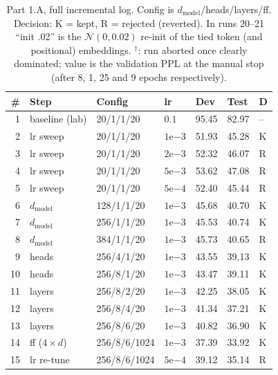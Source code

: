 \documentclass[a4paper]{article}
\begin{document}
\clearpage

\begin{table}[t]
  \centering
  \caption{Part 1.A, full incremental log. Config is $d_{\mathrm{model}}$/heads/layers/ff. Decision: K = kept, R = rejected (reverted). In runs 20--21 ``init .02'' is the $\mathcal{N}(0, 0.02)$ re-init of the tied token (and positional) embeddings. $^\dagger$: run aborted once clearly dominated; value is the validation PPL at the manual stop (after 8, 1, 25 and 9 epochs respectively).}
  \label{tab:parta}
  \scriptsize
  \begin{tabular}{@{}rllllll@{}}
    \toprule
    \# & Step & Config & lr & Dev & Test & D \\
    \midrule
    1  & baseline (lab)   & 20/1/1/20      & $0.1$              & 95.45 & 82.97 & -- \\
    2  & lr sweep         & 20/1/1/20      & $1\mathrm{e}{-3}$  & 51.93 & 45.28 & K \\
    3  & lr sweep         & 20/1/1/20      & $2\mathrm{e}{-3}$  & 52.32 & 46.07 & R \\
    4  & lr sweep         & 20/1/1/20      & $5\mathrm{e}{-3}$  & 53.62 & 47.08 & R \\
    5  & lr sweep         & 20/1/1/20      & $5\mathrm{e}{-4}$  & 52.40 & 45.44 & R \\
    6  & $d_{\mathrm{model}}$ & 128/1/1/20 & $1\mathrm{e}{-3}$  & 45.68 & 40.70 & K \\
    7  & $d_{\mathrm{model}}$ & 256/1/1/20 & $1\mathrm{e}{-3}$  & 45.53 & 40.74 & K \\
    8  & $d_{\mathrm{model}}$ & 384/1/1/20 & $1\mathrm{e}{-3}$  & 45.73 & 40.65 & R \\
    9  & heads            & 256/4/1/20     & $1\mathrm{e}{-3}$  & 43.55 & 39.13 & K \\
    10 & heads            & 256/8/1/20     & $1\mathrm{e}{-3}$  & 43.47 & 39.11 & K \\
    11 & layers           & 256/8/2/20     & $1\mathrm{e}{-3}$  & 42.25 & 38.05 & K \\
    12 & layers           & 256/8/4/20     & $1\mathrm{e}{-3}$  & 41.34 & 37.21 & K \\
    13 & layers           & 256/8/6/20     & $1\mathrm{e}{-3}$  & 40.82 & 36.90 & K \\
    14 & ff ($4 \times d$) & 256/8/6/1024  & $1\mathrm{e}{-3}$  & 37.39 & 33.92 & K \\
    15 & lr re-tune       & 256/8/6/1024   & $5\mathrm{e}{-4}$  & 39.12 & 35.14 & R \\

\end{tabular}
\end{table}
\end{document}
